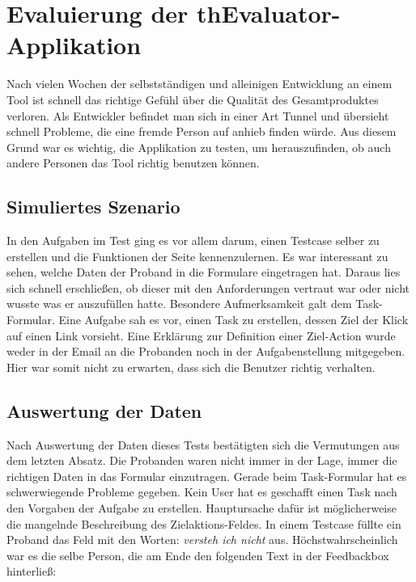 %
%
%
%

\section{Evaluierung der thEvaluator-Applikation}

Nach vielen Wochen der selbstständigen und alleinigen Entwicklung an einem Tool ist schnell das richtige Gefühl über die Qualität des Gesamtproduktes verloren. Als Entwickler befindet man sich in einer Art Tunnel und übersieht schnell Probleme, die eine fremde Person auf anhieb finden würde. Aus diesem Grund war es wichtig, die Applikation zu testen, um herauszufinden, ob auch andere Personen das Tool richtig benutzen können.

\subsection{Simuliertes Szenario}

In den Aufgaben im Test ging es vor allem darum, einen Testcase selber zu erstellen und die Funktionen der Seite kennenzulernen. Es war interessant zu sehen, welche Daten der Proband in die Formulare eingetragen hat. Daraus lies sich schnell erschließen, ob dieser mit den Anforderungen vertraut war oder nicht wusste was er auszufüllen hatte. Besondere Aufmerksamkeit galt dem Task-Formular. Eine Aufgabe sah es vor, einen Task zu erstellen, dessen Ziel der Klick auf einen Link vorsieht. Eine Erklärung zur Definition einer Ziel-Action wurde weder in der Email an die Probanden noch in der Aufgabenstellung mitgegeben. Hier war somit nicht zu erwarten, dass sich die Benutzer richtig verhalten.

\subsection{Auswertung der Daten}

Nach Auswertung der Daten dieses Tests bestätigten sich die Vermutungen aus dem letzten Absatz. Die Probanden waren nicht immer in der Lage, immer die richtigen Daten in das Formular einzutragen. Gerade beim Task-Formular hat es schwerwiegende Probleme gegeben. Kein User hat es geschafft einen Task nach den Vorgaben der Aufgabe zu erstellen. Hauptursache dafür ist möglicherweise die mangelnde Beschreibung des Zielaktions-Feldes. In einem Testcase füllte ein Proband das Feld mit den Worten: \glqq \textit{versteh ich nicht}\grqq{} aus. Höchstwahrscheinlich war es die selbe Person, die am Ende den folgenden Text in der Feedbackbox hinterließ:

